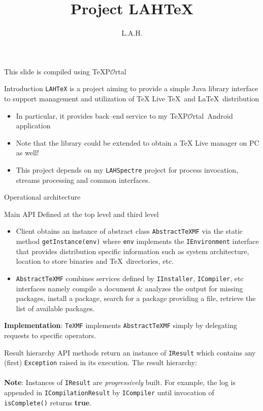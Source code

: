 \documentclass{beamer}
\title{Project LAHTeX}
\author{L.A.H.}
\newcommand{\TeXPortal}{\TeX P$\mathcal{O}$rtal}
\begin{document}
\begin{frame}
\titlepage
\begin{center}
\scriptsize{This slide is compiled using \TeXPortal}
\end{center}
\end{frame}

\begin{frame}[fragile]{Introduction}
\verb/LAHTeX/ is a project aiming to provide a simple Java library interface to support management and utilization of TeX Live \TeX\ and \LaTeX\ distribution
\begin{itemize}
\item In particular, it provides back--end service to my \TeXPortal\ Android application
\item Note that the library could be extended to obtain a TeX Live manager on PC as well!
\item This project depends on my \verb/LAHSpectre/ project for process invocation, streams processing and common interfaces.
\end{itemize}
\end{frame}

\begin{frame}[fragile]{Operational architecture}

\end{frame}

\begin{frame}[fragile]{Main API}
Defined at the top level and third level
\begin{itemize}
\item Client obtains an instance of abstract class \verb/AbstractTeXMF/ via the static method \verb/getInstance(env)/ where \verb/env/ implements the \verb/IEnvironment/ interface that provides distribution specific information such as system architecture, location to store binaries and \TeX\ directories, etc.
\item \verb/AbstractTeXMF/ combines services defined by \verb/IInstaller/, \verb/ICompiler/, etc interfaces namely compile a document \& analyzes the output for missing packages, install a package, search for a package providing a file, retrieve the list of available packages.
\end{itemize}
\textbf{Implementation}: \verb/TeXMF/ implements \verb/AbstractTeXMF/ simply by delegating requests to specific operators.
\end{frame}

\begin{frame}[fragile]{Result hierarchy}
API methods return an instance of \verb/IResult/ which contains any (first) \verb/Exception/ raised in its execution. The result hierarchy:\\\vspace{0.25cm}
\scalebox{0.7}{

}\\
\vspace{0.25cm}
\textbf{Note}: Instances of \verb/IResult/ are \emph{progressively} built. For example, the log is appended in  \verb/ICompilationResult/ by \verb/ICompiler/ until invocation of \verb/isComplete()/ returns \textbf{true}.
\end{frame}
\end{document}
